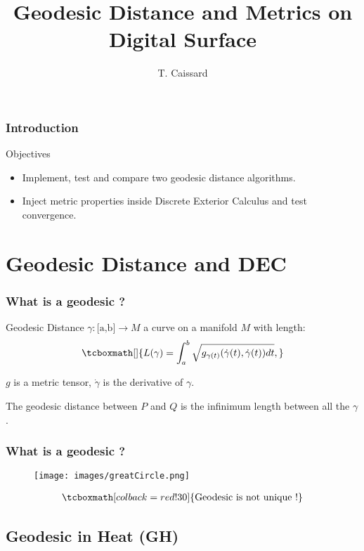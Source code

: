 \documentclass{beamer}
\title[Geodesic Distance]{Geodesic Distance and Metrics on Digital Surface}
\author
[Thomas Caissard - thomas.caissard@etu.univ-lyon1.fr]
{T. Caissard }%
\institute%
{
	{\bf Laboratoire d'InfoRmatique en Image et Syst\`emes d'information} \\
	{ \scriptsize{
			LIRIS UMR 5205 CNRS/INSA de Lyon/Universit\'e Claude Bernard Lyon 1/Universit\'e Lumi\`ere Lyon 2/Ecole Centrale de Lyon\\
			INSA de Lyon, b\^atiment J. Verne\\
			20, Avenue Albert Einstein - 69622 Villeurbanne cedex\\
			\url{http://liris.cnrs.fr}}
	}
}
\newcommand{\gatherblock}[2][]{\begin{gather*}\tcboxmath[#1]{#2}\end{gather*}}
\begin{document}
\begin{frame}
	\titlepage
\end{frame}

\begin{frame}	
	\frametitle{Introduction}
	\begin{block}{Objectives}
		\begin{itemize}
			\item Implement, test and compare two geodesic distance algorithms.
			\item Inject metric properties inside Discrete Exterior Calculus and test convergence.
		\end{itemize}
	\end{block}
\end{frame} 

\section{Geodesic Distance and DEC}

\begin{frame}
	\frametitle{What is a geodesic ?}
	
	\begin{block}{Geodesic Distance}
		$\gamma : \text{[a,b]} \rightarrow M$ a curve on a manifold $M$ with length:
		\gatherblock{L(\gamma)=\int_a^b \sqrt{g_{\gamma(t)} (\dot{\gamma}(t),\dot{\gamma}(t))dt },}
		
		$g$ is a metric tensor, $\dot{\gamma}$ is the derivative of $\gamma$.
		
		The geodesic distance between $P$ and $Q$ is the infinimum length between all the $\gamma$.
			
	\end{block}
	
\end{frame} 

\begin{frame}
	\frametitle{What is a geodesic ?}

	\begin{figure}
		\texttt{[image: images/greatCircle.png]}
	\end{figure}
	\begin{center}
	
	\gatherblock[colback=red!30]{\text{Geodesic is not unique !}}

	\end{center}
\end{frame}

\subsection{Geodesic in Heat (GH)}
\end{document}
